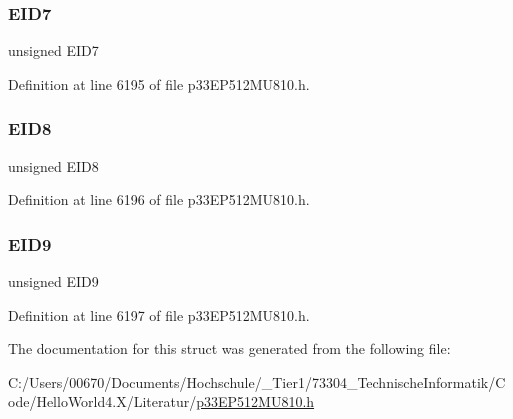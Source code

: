 \subsubsection{\texorpdfstring{E\+I\+D7}{EID7}}
{\footnotesize\ttfamily unsigned E\+I\+D7}



Definition at line 6195 of file p33\+E\+P512\+M\+U810.\+h.

\mbox{\label{structtag_c2_r_x_f0_e_i_d_b_i_t_s_acca25e0b7d86eb499d01f85222baea87}} 
\subsubsection{\texorpdfstring{E\+I\+D8}{EID8}}
{\footnotesize\ttfamily unsigned E\+I\+D8}



Definition at line 6196 of file p33\+E\+P512\+M\+U810.\+h.

\mbox{\label{structtag_c2_r_x_f0_e_i_d_b_i_t_s_ac6748f73d4ada8538b06548be4f396c2}} 
\subsubsection{\texorpdfstring{E\+I\+D9}{EID9}}
{\footnotesize\ttfamily unsigned E\+I\+D9}



Definition at line 6197 of file p33\+E\+P512\+M\+U810.\+h.



The documentation for this struct was generated from the following file\+:\begin{DoxyCompactItemize}
\item 
C\+:/\+Users/00670/\+Documents/\+Hochschule/\+\_\+\+Tier1/73304\+\_\+\+Technische\+Informatik/\+Code/\+Hello\+World4.\+X/\+Literatur/\hyperlink{p33_e_p512_m_u810_8h}{p33\+E\+P512\+M\+U810.\+h}\end{DoxyCompactItemize}
